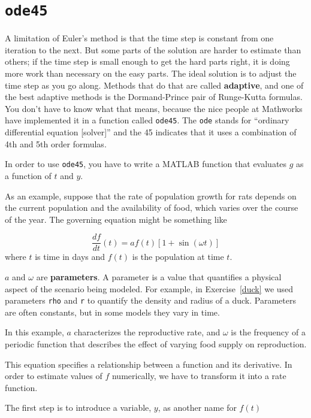 \documentclass{book}
\begin{document}
\section{{\tt ode45}}
\label{ode45}

A limitation of Euler's method is that the time step is constant from
one iteration to the next.  But some parts of the solution are
harder to estimate than others; if the time step is small enough to
get the hard parts right, it is doing more work than necessary on the
easy parts.  The ideal solution is to adjust the time step as you go
along.  Methods that do that are called {\bf adaptive}, and one of the
best adaptive methods is the Dormand-Prince pair of Runge-Kutta
formulas.  You don't have to know what that means,
because the nice people at Mathworks have implemented it in a function
called {\tt ode45}.  The {\tt ode} stands for ``ordinary differential
equation [solver]'' and the 45 indicates that it uses a combination of
4th and 5th order formulas.

In order to use {\tt ode45}, you have to write a MATLAB function
that evaluates $g$ as a function of
$t$ and $y$.


As an example, suppose that the rate of population growth for rats
depends on the current population and the availability of food,
which varies over the course of the year.
The governing equation might be something like

\[ \frac{df}{dt}(t) = a f(t) \left[1 + \sin (\omega t) \right] \]
%
where $t$ is time in days and $f(t)$ is the population at time $t$.

$a$ and $\omega$ are {\bf parameters}.  A parameter is a value that
quantifies a physical aspect of the scenario being modeled.  For
example, in Exercise~\ref{duck} we used parameters {\tt rho} and
{\tt r} to quantify the density and radius of a duck.  Parameters are
often constants, but in some models they vary in time.

In this example, $a$ characterizes the reproductive rate, and
$\omega$ is the frequency of a periodic function that describes
the effect of varying food supply on reproduction.

This equation specifies a relationship between a
function and its derivative.  In order to estimate values of
$f$ numerically, we have to transform it into a rate function.

The first step is to introduce a variable,
$y$, as another name for $f(t)$
\end{document}
